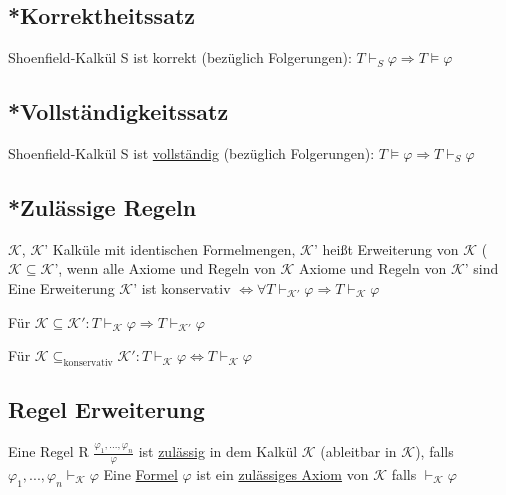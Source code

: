 \documentclass[12pt,a4paper]{article} %
\begin{document}
	\subsection{*Korrektheitssatz}
	Shoenfield-Kalkül S ist korrekt (bezüglich Folgerungen): $T \hyperref[Beweisbar]{\vdash_S} \varphi \Rightarrow T \hyperref[Erfullbar]{\vDash} \varphi$
	
	\subsection{*Vollständigkeitssatz}
	Shoenfield-Kalkül S ist \hyperref[ALVollstandig]{vollständig} (bezüglich Folgerungen): $T \hyperref[Erfullbar]{\vDash} \varphi \Rightarrow T \hyperref[Beweisbar]{\vdash_S} \varphi$
	
	\subsection{*Zulässige Regeln}
	\label{Zulassig}
	$\mathcal{K}$, $\mathcal{K}$' Kalküle mit identischen Formelmengen, $\mathcal{K}$' heißt Erweiterung von $\mathcal{K}$ ($\mathcal{K} \subseteq \mathcal{K}$', wenn alle Axiome und Regeln von $\mathcal{K}$ Axiome und Regeln von $\mathcal{K}$' sind \newline
	Eine Erweiterung $\mathcal{K}$' ist konservativ $\Leftrightarrow \forall T \hyperref[Beweisbar]{\vdash_{\mathcal{K}'}} \varphi \Rightarrow T \hyperref[Beweisbar]{\vdash_{\mathcal{K}}} \varphi$
	
	Für $\mathcal{K} \subseteq \mathcal{K}': T \hyperref[Beweisbar]{\vdash_{\mathcal{K}}} \varphi \Rightarrow T \hyperref[Beweisbar]{\vdash_{\mathcal{K}'}} \varphi$
	
	Für $\mathcal{K} \subseteq_{\text{konservativ}} \mathcal{K}': T \hyperref[Beweisbar]{\vdash_{\mathcal{K}}} \varphi \Leftrightarrow T \hyperref[Beweisbar]{\vdash_{\mathcal{K}}} \varphi$
	
	\subsection{Regel Erweiterung}
	Eine Regel R $\frac{\varphi_1, ..., \varphi_n}{\varphi}$ ist \hyperref[Zulassig]{zulässig} in dem Kalkül $\mathcal{K}$ (ableitbar in $\mathcal{K}$), falls $\varphi_1, ..., \varphi_n \hyperref[Beweisbar]{\vdash_{\mathcal{K}}} \varphi$ \newline
	Eine \hyperref[Formel]{Formel} $\varphi$ ist ein \hyperref[Zulassig]{zulässiges Axiom} von $\mathcal{K}$ falls $\hyperref[Beweisbar]{\vdash_{\mathcal{K}}} \varphi$
	
\end{document}
